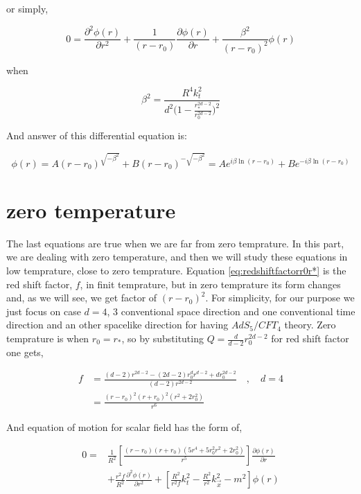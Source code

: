 or simply,

\begin{equation}
    0 = \frac{\partial^2 \phi(r)}{\partial r^2} + \frac{1}{(r-r_0)} \frac{\partial \phi(r)}{\partial r} + \frac{\beta^2}{(r-r_0)^2} \phi(r)
\end{equation}

when

\begin{equation}
    \beta^2 = \frac{R^4k^2_t}{d^2\big(1-\frac{r^{2d-2}_*}{r^{2d-2}_0}\big)^2}
\end{equation}

And answer of this differential equation is:

\begin{equation} \label{eq:chargedblackholenearhorizonsolution}
    \phi(r) = A(r-r_0)^{ \sqrt{ - \beta^2}} + B(r-r_0)^{- \sqrt{-\beta^2}} = Ae^{ i\beta \ln{(r-r_0)}} + Be^{- i\beta\ln{(r-r_0)}} 
\end{equation}

\section{zero temperature}

The last equations are true when we are far from zero temprature. In this part, we are dealing with zero temperature, and then we will study these equations in low temprature, close to zero temprature. Equation \ref{eq:redshiftfactorr0r*} is the red shift factor, $f$, in finit temprature, but in zero temprature its form changes and, as we will see, we get factor of $(r-r_0)^2$. For simplicity, for our purpose we just focus on case $d = 4$, $3$ conventional space direction and one conventional time direction and an other spacelike direction for having $AdS_5/CFT_4$ theory. Zero temprature is when $r_0 = r_*$, so by substituting $Q = \frac{d}{d-2}r_0^{2d-2} $ for red shift factor one gets,

\begin{align} \label{eq:redshiftfactorr0r*zeroT}
    f &= \frac{(d-2)r^{2d-2} - (2d-2)r_0^{d}r^{d-2} + dr_0^{2d-2}}{(d-2)r^{2d-2}} \quad , \quad d = 4 \nonumber\\
      &= \frac{(r-r_0)^2(r+r_0)^2(r^2 + 2r_0^2)}{r^6}
\end{align}

And equation of motion for scalar field has the form of,

\begin{align} \label{eq:equationofmotionchargeblackholeinadsZetorT}
    0 =& \frac{1}{R^2}\left[\frac{(r-r_0)(r+r_0)(5r^4 + 5r_0^2r^2 + 2r_0^2)}{r^5}\right]\frac{\partial \phi(r)}{\partial r} \nonumber\\
      &+ \frac{r^2f}{R^2}\frac{\partial^2\phi(r)}{\partial r^2} + \left[ \frac{R^2}{r^2f}k^2_t-\frac{R^2}{r^2}k^2_{\vec{x}}-m^2\right]\phi(r)
\end{align} 

